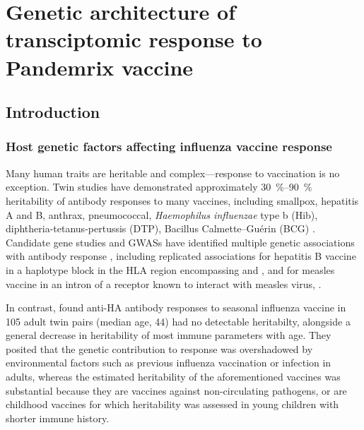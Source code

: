 %
%

\chapter{Genetic architecture of transciptomic response to Pandemrix vaccine}
\label{ch:hird_reQTL}



\section{Introduction}

\subsection{Host genetic factors affecting influenza vaccine response}
\label{subsec:hird_reQTL_intro_geneticFactorsFluVaccine}

Many human traits are heritable and complex---response to vaccination is no exception.
Twin studies have demonstrated approximately \SIrange{30}{90}{\percent} heritability of antibody responses to many vaccines, including smallpox, hepatitis A and B, anthrax, pneumococcal, \textit{Haemophilus influenzae} type b (Hib), diphtheria-tetanus-pertussis (DTP), Bacillus Calmette--Guérin (BCG) \autocite{mooney2013SystemsImmunogeneticsVaccines,oconnor2013CharacterizingVaccineResponses,newport2015GeneticRegulationInfant,brodin2015VariationHumanImmune}.
Candidate gene studies and \glspl{GWAS} have identified multiple genetic associations with antibody response \autocite{mooney2013SystemsImmunogeneticsVaccines,oconnor2013CharacterizingVaccineResponses,mentzer2015SearchingHumanGenetic,linnik2016ImpactHostGenetic}, 
including replicated associations 
for hepatitis B vaccine in a haplotype block in the \gls{HLA} region encompassing  and ,
and for measles vaccine in an intron of a receptor known to interact with measles virus, .

In contrast, \textcite{brodin2015VariationHumanImmune} found anti-\gls{HA} antibody responses to seasonal influenza vaccine in 105 adult twin pairs (median age, \SI{44}{\year}) had no detectable heritabilty,
alongside a general decrease in heritability of most immune parameters with age.
They posited 
that the genetic contribution to response was overshadowed by environmental factors such as previous influenza vaccination or infection in adults, 
whereas the estimated heritability of the aforementioned vaccines was substantial
because they are vaccines against non-circulating pathogens, 
or are childhood vaccines for which heritability was assessed in young children with shorter immune history.

